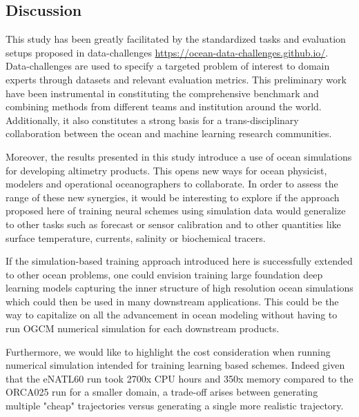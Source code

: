 \begin{bibunit}
\section{Discussion}
\label{c4sec:discussion}
This study has been greatly facilitated by the standardized tasks and evaluation setups proposed in data-challenges \url{https://ocean-data-challenges.github.io/}. Data-challenges are used to specify a targeted problem of interest to domain experts through datasets and relevant evaluation metrics. This preliminary work have been instrumental in constituting the comprehensive benchmark and combining methods from different teams and institution around the world. Additionally, it also constitutes a strong basis for a trans-disciplinary collaboration between the ocean and machine learning research communities.

Moreover, the results presented in this study introduce a use of ocean simulations for developing altimetry products. This opens new ways for ocean physicist, modelers and operational oceanographers to collaborate. In order to assess the range of these new synergies, it would be interesting to explore if the approach proposed here of training neural schemes using simulation data would generalize to other tasks such as forecast or sensor calibration and to other quantities like surface temperature, currents, salinity or biochemical tracers.

If the simulation-based training approach introduced here is successfully extended to other ocean problems, one could envision training large foundation deep learning models \cite{brownLanguageModelsAre} capturing the inner structure of high resolution ocean simulations which could then be used in many downstream applications. This could be the way to capitalize on all the advancement in ocean modeling without having to run OGCM numerical simulation for each downstream products.    

Furthermore, we would like to highlight the cost consideration when running numerical simulation intended for training learning based schemes. Indeed given that the eNATL60 run took 2700x CPU hours and 350x memory compared to the ORCA025 run for a smaller domain, a trade-off arises between generating multiple "cheap" trajectories versus generating a single more realistic trajectory. 


\end{bibunit}
